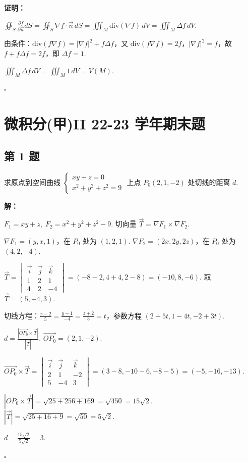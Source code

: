 \documentclass[12pt,a4paper]{article}
\newenvironment{sol}[1][解]{%
  \par\medskip\noindent\textbf{#1：}\itshape\par\noindent\ignorespaces
}{%
  \par\hfill$\square$\par\medskip
}
\begin{document}
\begin{sol}[证明]$\oiint_S\frac{\partial
  f}{\partial\vec{n}}dS=\oiint_S\nabla
  f\cdot\vec{n}\,dS=\iiint_M\text{div}(\nabla f)\,dV=\iiint_M\Delta f\,dV.$

  由条件：$\text{div}(f\nabla f)=|\nabla f|^2+f\Delta f$，又
  $\text{div}(f\nabla f)=2f$，$|\nabla f|^2=f$，故 $f+f\Delta f=2f$，即 $\Delta f=1$.

  $\iiint_M\Delta f\,dV=\iiint_M 1\,dV=V(M).$
\end{sol}
\section*{微积分(甲)II 22-23 学年期末题}

\subsection*{第 1 题}
求原点到空间曲线 $
\begin{cases}xy+z=0 \\ x^2+y^2+z^2=9
\end{cases}$ 上点 $P_0(2,1,-2)$ 处切线的距离 $d$.

\begin{sol}$F_1=xy+z,\; F_2=x^2+y^2+z^2-9$. 切向量 $\vec{T}=\nabla
  F_1\times\nabla F_2$.

  $\nabla F_1=(y,x,1)$，在 $P_0$ 处为 $(1,2,1)$. $\nabla F_2=(2x,2y,2z)$，在
  $P_0$ 处为 $(4,2,-4)$.

  $\vec{T}=
  \begin{vmatrix}\vec{i}&\vec{j}&\vec{k}\\1&2&1\\4&2&-4
  \end{vmatrix}=(-8-2,4+4,2-8)=(-10,8,-6)$. 取 $\vec{T}=(5,-4,3)$.

  切线方程：$\frac{x-2}{5}=\frac{y-1}{-4}=\frac{z+2}{3}=t$，参数方程 $(2+5t,1-4t,-2+3t)$.

  $d=\frac{|\vec{OP_0}\times\vec{T}|}{|\vec{T}|}$. $\vec{OP_0}=(2,1,-2)$.

  $\vec{OP_0}\times\vec{T}=
  \begin{vmatrix}\vec{i}&\vec{j}&\vec{k}\\2&1&-2\\5&-4&3
  \end{vmatrix}=(3-8,-10-6,-8-5)=(-5,-16,-13)$.

  $|\vec{OP_0}\times\vec{T}|=\sqrt{25+256+169}=\sqrt{450}=15\sqrt{2}$.
  $|\vec{T}|=\sqrt{25+16+9}=\sqrt{50}=5\sqrt{2}$.

  $d=\frac{15\sqrt{2}}{5\sqrt{2}}=3.$

\end{sol}
\end{document}
